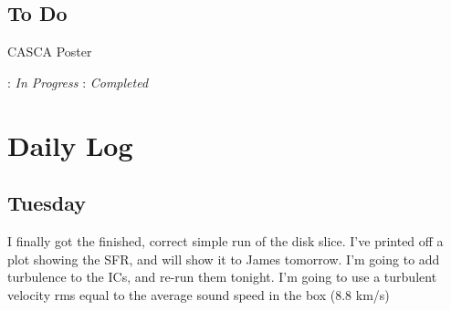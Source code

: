 \documentclass[11pt,letterpaper]{article}
\begin{document}
\pagebreak
\subsection*{To Do}
\begin{bullets}
\item[\checkmark] CASCA Poster
\end{bullets}

\textleaf : \textit{In Progress} \qquad \checkmark : \textit{Completed}

\section*{Daily Log}
\subsection*{Tuesday}
I finally got the finished, correct simple run of the disk slice. I've printed
off a plot showing the SFR, and will show it to James tomorrow. I'm going to add
turbulence to the ICs, and re-run them tonight. I'm going to use a turbulent 
velocity rms equal to the average sound speed in the box (8.8 km/s)
\end{document}
